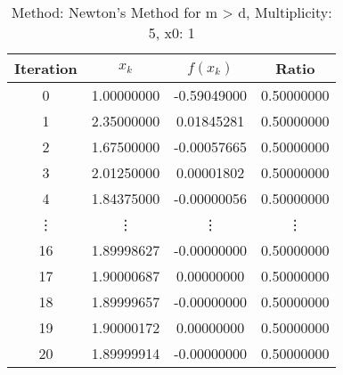 \begin{table}
\centering
\caption{Method: Newton's Method for m > d, Multiplicity: 5, x0: 1}
\label{tab:table_Newton's_Method_for_m_>_d_5_1}
\begin{tabular}{c c c c}
\toprule
Iteration &      $x_k$ &    $f(x_k)$ &      Ratio \\
\midrule
        0 & 1.00000000 & -0.59049000 & 0.50000000 \\
        1 & 2.35000000 &  0.01845281 & 0.50000000 \\
        2 & 1.67500000 & -0.00057665 & 0.50000000 \\
        3 & 2.01250000 &  0.00001802 & 0.50000000 \\
        4 & 1.84375000 & -0.00000056 & 0.50000000 \\
   \vdots &     \vdots &      \vdots &     \vdots \\
       16 & 1.89998627 & -0.00000000 & 0.50000000 \\
       17 & 1.90000687 &  0.00000000 & 0.50000000 \\
       18 & 1.89999657 & -0.00000000 & 0.50000000 \\
       19 & 1.90000172 &  0.00000000 & 0.50000000 \\
       20 & 1.89999914 & -0.00000000 & 0.50000000 \\
\bottomrule
\end{tabular}
\end{table}
